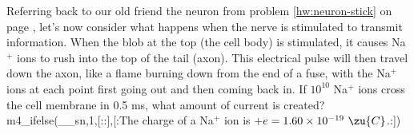         Referring back to our old friend the neuron from problem \ref{hw:neuron-stick} on page \pageref{hw:neuron-stick},
        let's now consider what
        happens when the nerve is stimulated to transmit information.
         When the blob at the top (the cell body) is stimulated, it
        causes Na$^+$ ions to rush into the top of the tail (axon). 
        This electrical pulse will then travel down the axon, like a
        flame burning down from the end of a fuse, with the Na$^+$ ions
        at each point first going out and then coming back in.  If
        $10^{10}$  Na$^+$ ions cross the cell membrane in 0.5 ms, what
        amount of current is created?
m4_ifelse(__sn,1,[::],[:The
charge of a Na$^+$ ion is $+e=1.60\times10^{-19}\ \zu{C}$.:])
        \answercheck
